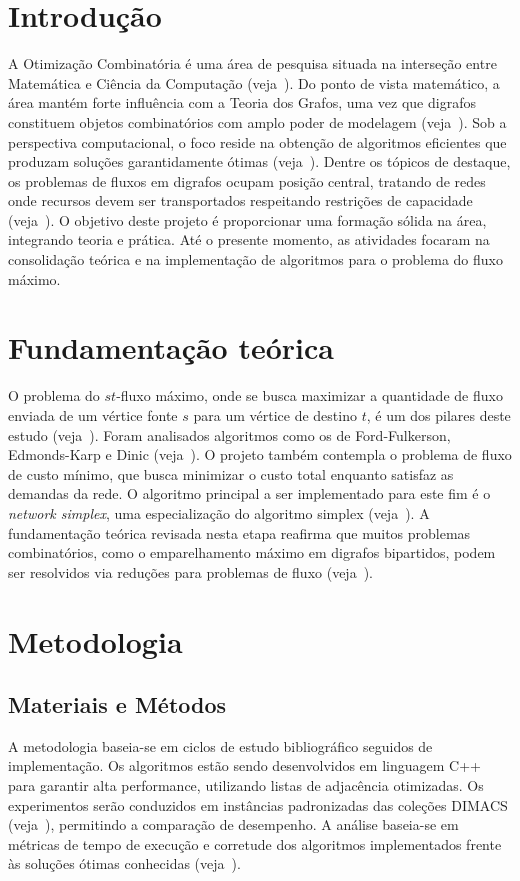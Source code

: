 \documentclass[12pt,a4paper]{article}
\begin{document}
\section{Introdução}
A Otimização Combinatória é uma área de pesquisa situada na interseção entre Matemática e Ciência da Computação (veja~\cite{korte2018combinatorial}). Do ponto de vista matemático, a área mantém forte influência com a Teoria dos Grafos, uma vez que digrafos constituem objetos combinatórios com amplo poder de modelagem (veja~\cite{bondy2008graph, diestel2017graph}).
Sob a perspectiva computacional, o foco reside na obtenção de algoritmos eficientes que produzam soluções garantidamente ótimas (veja~\cite{schrijver2003combinatorial, cook1998combinatorial}). Dentre os tópicos de destaque, os problemas de fluxos em digrafos ocupam posição central, tratando de redes onde recursos devem ser transportados respeitando restrições de capacidade (veja~\cite{ahuja1993network}).
O objetivo deste projeto é proporcionar uma formação sólida na área, integrando teoria e prática. Até o presente momento, as atividades focaram na consolidação teórica e na implementação de algoritmos para o problema do fluxo máximo.

\section{Fundamentação teórica}
O problema do $st$-fluxo máximo, onde se busca maximizar a quantidade de fluxo enviada de um vértice fonte $s$ para um vértice de destino $t$, é um dos pilares deste estudo (veja~\cite{ford1956maximal}). Foram analisados algoritmos como os de Ford-Fulkerson, Edmonds-Karp e Dinic (veja~\cite{ford1956maximal, edmonds1972theoretical, dinic1970algorithm}).
O projeto também contempla o problema de fluxo de custo mínimo, que busca minimizar o custo total enquanto satisfaz as demandas da rede. O algoritmo principal a ser implementado para este fim é o \textit{network simplex}, uma especialização do algoritmo simplex (veja~\cite{dantzig1951application, ahuja1993network}).
A fundamentação teórica revisada nesta etapa reafirma que muitos problemas combinatórios, como o emparelhamento máximo em digrafos bipartidos, podem ser resolvidos via reduções para problemas de fluxo (veja~\cite{ahuja1993network}).

\section{Metodologia}
\subsection{Materiais e Métodos}
A metodologia baseia-se em ciclos de estudo bibliográfico seguidos de implementação. Os algoritmos estão sendo desenvolvidos em linguagem C++ para garantir alta performance, utilizando listas de adjacência otimizadas.
Os experimentos serão conduzidos em instâncias padronizadas das coleções DIMACS (veja~\cite{Jensen2022}), permitindo a comparação de desempenho. A análise baseia-se em métricas de tempo de execução e corretude dos algoritmos implementados frente às soluções ótimas conhecidas (veja~\cite{ford1956maximal}).
\end{document}
